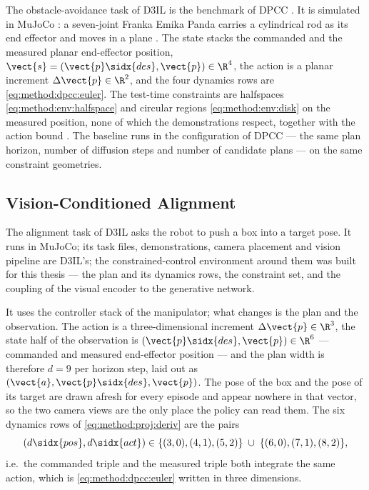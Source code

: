 The obstacle-avoidance task of D3IL \parencite{jia2024towards} is the benchmark of \ac{DPCC}
\parencite[Sec.~6.1]{romer2025diffusion}. It is simulated in MuJoCo
\parencite{todorov2012mujoco}: a seven-joint Franka Emika Panda carries a cylindrical rod as its end
effector and moves in a plane \parencite[Sec.~3.3]{jia2024towards}. The state stacks the commanded and the measured planar
end-effector position, $\vect{s} = (\vect{p}\sidx{des},\vect{p})\in\R^{4}$, the action is a planar
increment $\Delta\vect{p}\in\R^{2}$, and the four dynamics rows are \eqref{eq:method:dpcc:euler}. The
test-time constraints are halfspaces \eqref{eq:method:env:halfspace} and circular regions
\eqref{eq:method:env:disk} on the measured position, none of which the demonstrations respect, together
with the action bound \parencite[Sec.~6.1]{romer2025diffusion}. The baseline runs in the configuration of \ac{DPCC} --- the
same plan horizon, number of diffusion steps and number of candidate plans --- on the
same constraint geometries.

\subsection{Vision-Conditioned Alignment}\label{sec:method:env:aligning}

The alignment task of D3IL \parencite{jia2024towards} asks the robot to push a box into a target
pose. It runs in MuJoCo; its task files, demonstrations, camera placement and vision pipeline are
D3IL's; the constrained-control environment
around them was built for this thesis --- the plan and its dynamics rows, the constraint set, and the
coupling of the visual encoder to the generative network.

It uses the controller stack of the manipulator; what changes is the plan and the observation. The action is a three-dimensional increment $\Delta\vect{p}\in\R^{3}$, the state
half of the observation is $(\vect{p}\sidx{des},\vect{p})\in\R^{6}$ --- commanded and measured
end-effector position --- and the plan width is therefore $d = 9$ per horizon step, laid out as
$(\vect{a},\vect{p}\sidx{des},\vect{p})$. The pose of the box and the pose of its target are drawn
afresh for every episode and appear nowhere in that vector, so the two camera views are the only
place the policy can read them.
 The six dynamics rows of
\eqref{eq:method:proj:deriv} are the pairs
\begin{equation}\label{eq:method:dep:varows}
  \left(d\sidx{pos},d\sidx{act}\right) \in
  \{(3,0),(4,1),(5,2)\}\;\cup\;\{(6,0),(7,1),(8,2)\},
\end{equation}
i.e.\ the commanded triple and the measured triple both integrate the same action, which is
\eqref{eq:method:dpcc:euler} written in three dimensions.

